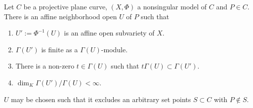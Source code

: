    \begin{lemma}\label{SecondTechnicalNonsingularModelLemma}
        Let $C$ be a projective plane curve, $(X,\Phi)$ a nonsingular model of $C$ and $P\in C$. There is an affine neighborhood open $U$ of $P$ such that 
        \begin{enumerate}
            \item $U':=\Phi^{-1}(U)$ is an affine open subvariety of $X$.
            \item $\Gamma(U')$ is finite as a $\Gamma(U)$-module.
            \item There is a non-zero $t\in \Gamma(U)$ such that $t\Gamma(U)\subset \Gamma(U')$.
            \item $\dim_K \Gamma(U')/\Gamma(U)<\infty$.
        \end{enumerate}
        $U$ may be chosen such that it excludes an arbitrary set points $S\subset C$ with $P\notin S$.
    \end{lemma}
